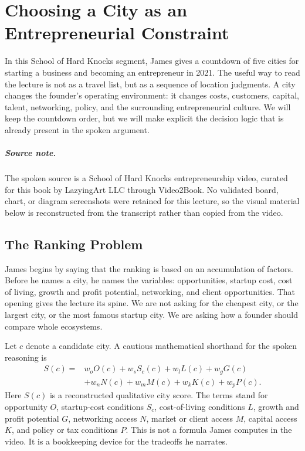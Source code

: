\chapter{Choosing a City as an Entrepreneurial Constraint}

In this School of Hard Knocks segment, James gives a countdown of five cities for starting a business and becoming an entrepreneur in 2021. The useful way to read the lecture is not as a travel list, but as a sequence of location judgments. A city changes the founder's operating environment: it changes costs, customers, capital, talent, networking, policy, and the surrounding entrepreneurial culture. We will keep the countdown order, but we will make explicit the decision logic that is already present in the spoken argument.

\paragraph{Source note.}
The spoken source is a School of Hard Knocks entrepreneurship video, curated for this book by LazyingArt LLC through Video2Book. No validated board, chart, or diagram screenshots were retained for this lecture, so the visual material below is reconstructed from the transcript rather than copied from the video.

\section{The Ranking Problem}

James begins by saying that the ranking is based on an accumulation of factors. Before he names a city, he names the variables: opportunities, startup cost, cost of living, growth and profit potential, networking, and client opportunities. That opening gives the lecture its spine. We are not asking for the cheapest city, or the largest city, or the most famous startup city. We are asking how a founder should compare whole ecosystems.

Let \(c\) denote a candidate city. A cautious mathematical shorthand for the spoken reasoning is
\begin{equation}
\begin{aligned}
S(c)
={}&
w_oO(c)
+w_sS_c(c)
+w_lL(c)
+w_gG(c) \\
&+
w_nN(c)
+w_mM(c)
+w_kK(c)
+w_pP(c).
\end{aligned}
\end{equation}
Here \(S(c)\) is a reconstructed qualitative city score. The terms stand for opportunity \(O\), startup-cost conditions \(S_c\), cost-of-living conditions \(L\), growth and profit potential \(G\), networking access \(N\), market or client access \(M\), capital access \(K\), and policy or tax conditions \(P\). This is not a formula James computes in the video. It is a bookkeeping device for the tradeoffs he narrates.

